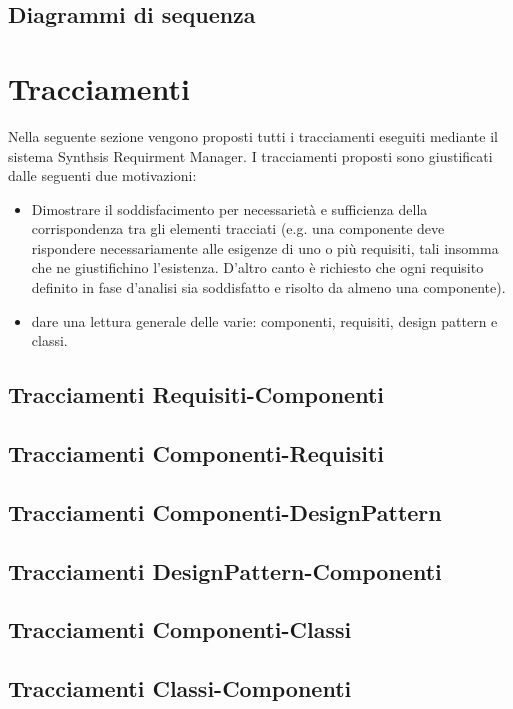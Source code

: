\subsection{Diagrammi di sequenza}
\clearpage

\section{Tracciamenti}
Nella seguente sezione vengono proposti tutti i tracciamenti eseguiti mediante il sistema Synthsis Requirment Manager. I tracciamenti proposti sono giustificati dalle seguenti due motivazioni:

\begin{itemize}
	\item Dimostrare il soddisfacimento per necessarietà e sufficienza della corrispondenza tra gli elementi tracciati (e.g. una componente deve rispondere necessariamente alle esigenze di uno o più requisiti, tali insomma che ne giustifichino l'esistenza. D'altro canto è richiesto che ogni requisito definito in fase d'analisi sia soddisfatto e risolto da almeno una componente).
	\item dare una lettura generale delle varie: componenti, requisiti, design pattern e classi.
\end{itemize}

\subsection{Tracciamenti Requisiti-Componenti}

\subsection{Tracciamenti Componenti-Requisiti}

\subsection{Tracciamenti Componenti-DesignPattern}

\subsection{Tracciamenti DesignPattern-Componenti}

\subsection{Tracciamenti Componenti-Classi}

\subsection{Tracciamenti Classi-Componenti}

